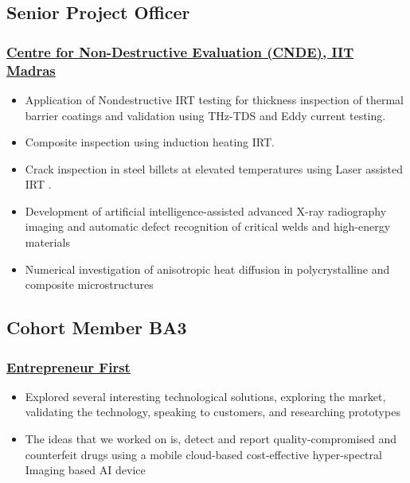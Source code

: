 \documentclass{my_cv}%
\begin{document}
\subsection{Senior Project Officer}
\subsubsection{\href{https://www.cnde.in/}{Centre for Non-Destructive Evaluation (CNDE), IIT Madras}}
\begin{itemize}[leftmargin=0.15in]
\setlength\itemsep{-0.1em}
\color{mygray}
\item Application of Nondestructive IRT testing for thickness inspection of thermal barrier coatings and validation using THz-TDS and Eddy current testing.
\item Composite inspection using induction heating IRT. 
\item Crack inspection in steel billets at elevated temperatures using Laser assisted IRT .
\item Development of artificial intelligence-assisted advanced X-ray radiography imaging and automatic defect recognition of critical welds and high-energy materials 
\item Numerical investigation of anisotropic heat diffusion in polycrystalline and composite microstructures 
\end{itemize}%
{\color{mygray1} \hdashrule[0.1ex]{18.8cm}{0.2mm}{1mm}}
\subsection{Cohort Member BA3}
\subsubsection{\href{https://www.joinef.com/}{Entrepreneur First}}
\begin{itemize}[leftmargin=0.15in]
\setlength\itemsep{-0.1em}
\color{mygray}
\item Explored several interesting technological solutions, exploring the market, validating the technology, speaking to customers, and researching prototypes
\item The ideas that we worked on is, detect and report quality-compromised and counterfeit drugs using a mobile cloud-based cost-effective hyper-spectral Imaging based AI device
\end{itemize}
{\color{mygray1} \hdashrule[0.1ex]{18.8cm}{0.2mm}{1mm}}
\end{document}
